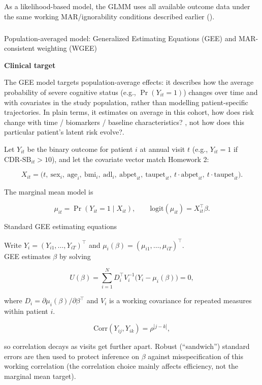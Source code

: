 \documentclass[
  9pt,
  letterpaper,
  DIV=11,
  numbers=noendperiod]{scrartcl}
\makeatletter
\let\oldsubparagraph\subparagraph
\renewcommand{\subparagraph}{
    \@ifstar
      \xxxSubParagraphStar
      \xxxSubParagraphNoStar
  }
\newcommand{\xxxSubParagraphStar}[1]{\oldsubparagraph*{#1}\mbox{}}
\newcommand{\xxxSubParagraphNoStar}[1]{\oldsubparagraph{#1}\mbox{}}
\makeatother
\begin{document}
As a likelihood-based model, the GLMM uses all available outcome data
under the same working MAR/ignorability conditions described earlier
().

\subparagraph{Population-averaged model: Generalized Estimating
Equations (GEE) and MAR-consistent weighting
(WGEE)}\label{population-averaged-model-generalized-estimating-equations-gee-and-mar-consistent-weighting-wgee}

\textbf{Clinical target}

The GEE model targets population-average effects: it describes how the
average probability of severe cognitive status (e.g., \(\Pr(Y_{it}=1)\))
changes over time and with covariates in the study population, rather
than modelling patient-specific trajectories. In plain terms, it
estimates on average in this cohort, how does risk change with time /
biomarkers / baseline characteristics? , not how does this particular
patient's latent risk evolve?.

Let \(Y_{it}\) be the binary outcome for patient \(i\) at annual visit
\(t\) (e.g., \(Y_{it}=1\) if \(\mathrm{CDR\text{-}SB}_{it}>10\)), and
let the covariate vector match Homework 2:

\[
X_{it} =
\Big(
t,\ \text{sex}_i,\ \text{age}_i,\ \text{bmi}_i,\ \text{adl}_i,\ 
\text{abpet}_{it},\ \text{taupet}_{it},\ 
t \cdot \text{abpet}_{it},\ t \cdot \text{taupet}_{it}
\Big).
\]

The marginal mean model is

\[
\mu_{it} = \Pr(Y_{it}=1 \mid X_{it}), 
\qquad
\text{logit}(\mu_{it}) = X_{it}^\top \beta.
\]

Standard GEE estimating equations

Write \(Y_i = (Y_{i1},\dots,Y_{iT})^\top\) and
\(\mu_i(\beta)=(\mu_{i1},\dots,\mu_{iT})^\top\).\\
GEE estimates \(\beta\) by solving

\[
U(\beta)=\sum_{i=1}^{N} D_i^\top V_i^{-1}\big(Y_i-\mu_i(\beta)\big)=0,
\]

where \(D_i=\partial \mu_i(\beta)/\partial \beta^\top\) and \(V_i\) is a
working covariance for repeated measures within patient \(i\).

\[
\text{Corr}(Y_{ij},Y_{ik})=\rho^{|j-k|},
\]

so correlation decays as visits get further apart. Robust (``sandwich'')
standard errors are then used to protect inference on \(\beta\) against
misspecification of this working correlation (the correlation choice
mainly affects efficiency, not the marginal mean target).
\end{document}
